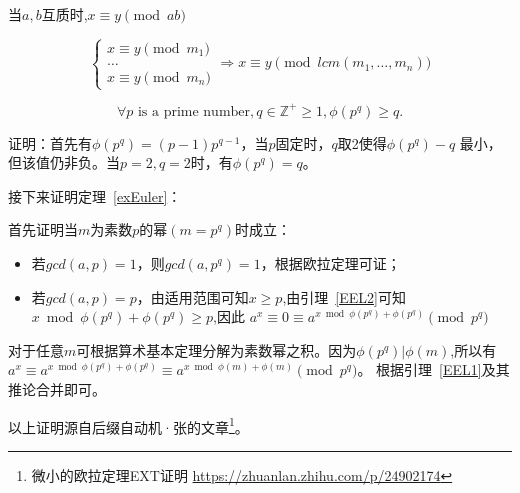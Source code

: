 \begin{inference}
	当$a,b$互质时,$x\equiv y \pmod{ab}$
\end{inference}

\begin{inference}
	\begin{displaymath}
		\left\{
		\begin{array}{l}
			x\equiv y \pmod{m_1} \\
			\ldots\\
			x\equiv y \pmod{m_n}
		\end{array}
		\right.
		\Rightarrow x\equiv y \pmod{lcm(m_1,\ldots,m_n)}
	\end{displaymath}
\end{inference}

\begin{lemma}\label{EEL2}
	\begin{displaymath}
		\forall p\textrm{ is a prime number},q\in \mathbb{Z^+}\ge 1,
		\phi(p^q)\geq q.
	\end{displaymath}
\end{lemma}

证明：首先有$\phi(p^q)=(p-1)p^{q-1}$，当$p$固定时，$q$取2使得$\phi(p^q)-q$
最小，但该值仍非负。当$p=2,q=2$时，有$\phi(p^q)=q$。

接下来证明定理~\ref{exEuler}：

首先证明当$m$为素数$p$的幂$(m=p^q)$时成立：
\begin{itemize}
	\item 若$gcd(a,p)=1$，则$gcd(a,p^q)=1$，根据欧拉定理可证；
	\item 若$gcd(a,p)=p$，由适用范围可知$x\geq p$,由引理~\ref{EEL2}可知
	$x \bmod \phi(p^q) + \phi(p^q) \geq p$,因此
	$a^x\equiv 0 \equiv a^{x \bmod \phi(p^q)+\phi(p^q)} \pmod{p^q}$
\end{itemize}

对于任意$m$可根据算术基本定理分解为素数幂之积。因为$\phi(p^q)|\phi(m)$,所以有
$a^x\equiv a^{x \bmod \phi(p^q)+\phi(p^q)}
\equiv a^{x \bmod \phi(m)+\phi(m)} \pmod{p^q}$。
根据引理~\ref{EEL1}及其推论合并即可。

以上证明源自后缀自动机·张的文章\footnote{微小的欧拉定理EXT证明
	\url{https://zhuanlan.zhihu.com/p/24902174}}。
